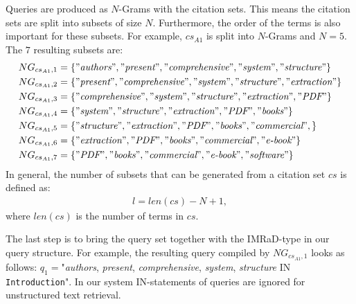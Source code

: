 Queries are produced as $N$-Grams with the citation sets. This means the citation sets are split into subsets of size $N$. Furthermore, the order of the terms is also important for these subsets. For example, $cs_{A1}$ is split into $N$-Grams and $N = 5$. The $7$ resulting subsets are:
\begin{align*}
  NG_{cs_{A1}, 1} &= \{"\textit{authors}", "\textit{present}", "\textit{comprehensive}", "\textit{system}", "\textit{structure}"\} \nonumber \\
  NG_{cs_{A1}, 2} &= \{"\textit{present}", "\textit{comprehensive}", "\textit{system}", "\textit{structure}", "\textit{extraction}"\} \nonumber \\
  NG_{cs_{A1}, 3} &= \{"\textit{comprehensive}", "\textit{system}", "\textit{structure}", "\textit{extraction}", "\textit{PDF}"\} \nonumber \\
  NG_{cs_{A1}, 4} &= \{"\textit{system}", "\textit{structure}", "\textit{extraction}", "\textit{PDF}", "\textit{books}"\} \nonumber \\
  NG_{cs_{A1}, 5} &= \{"\textit{structure}", "\textit{extraction}", "\textit{PDF}", "\textit{books}", "\textit{commercial}",\} \nonumber \\
  NG_{cs_{A1}, 6} &= \{"\textit{extraction}", "\textit{PDF}", "\textit{books}", "\textit{commercial}", "\textit{e-book}"\} \nonumber \\
  NG_{cs_{A1}, 7} &= \{"\textit{PDF}", "\textit{books}", "\textit{commercial}", "\textit{e-book}", "\textit{software}"\} \nonumber \\
\end{align*}
In general, the number of subsets that can be generated from a citation set $cs$ is defined as:
\begin{align}
  l = len(cs) - N + 1,
\end{align}
where $len(cs)$ is the number of terms in $cs$. 

The last step is to bring the query set together with the IMRaD-type in our query structure. For example, the resulting query compiled by $NG_{cs_{A1}, 1}$ looks as follows: $q_1=$"\textit{authors}, \textit{present}, \textit{comprehensive}, \textit{system}, \textit{structure} IN \texttt{Introduction}". In our system IN-statements of queries are ignored for unstructured text retrieval.

